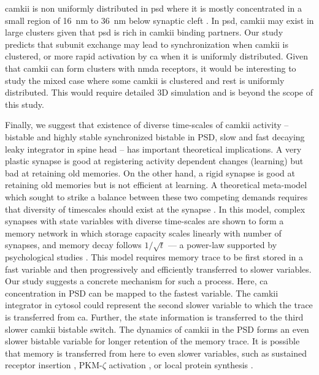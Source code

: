 \documentclass[9pt,lineno]{elife}
\begin{document}
\Gls{camkii} is non uniformly distributed in \gls{psd} where it is mostly
concentrated in a small region of \SI{16}{\nano \meter} to \SI{36}{\nano \meter}
below synaptic cleft \citep{petersen_distribution_2003}. In \gls{psd},
\gls{camkii} may exist in large clusters given that \gls{psd} is rich in
\gls{camkii} binding partners.  Our study predicts that subunit exchange may
lead to synchronization when \gls{camkii} is clustered, or more rapid activation
by \gls{ca} when it is uniformly distributed. Given that \gls{camkii} can form
clusters with \gls{nmda} receptors, it would be interesting to study the mixed
case where some \gls{camkii} is clustered and rest is uniformly distributed.
This would require detailed 3D simulation and is beyond the scope of this study.

Finally, we suggest that existence of diverse time-scales of \gls{camkii}
activity -- bistable and highly stable synchronized bistable in PSD, slow and
fast decaying leaky integrator in spine head -- has important theoretical
implications. A very plastic synapse is good at registering activity dependent
changes (learning) but bad at retaining old memories. On the other hand, a rigid
synapse is good at retaining old memories but is not efficient at learning. A
theoretical meta-model which sought to strike a balance between these two
competing demands requires that diversity of timescales should exist at the
synapse \citep{benna_computational_2016}. In this model, complex synapses with
state variables with diverse time-scales are shown to form a memory network in
which storage capacity scales linearly with number of synapses, and memory decay
follows \(1/\sqrt{t}\) --- a power-law supported by psychological studies
\citep{wixted_form_1991}. This model requires memory trace to be first stored in
a fast variable and then progressively and efficiently transferred to slower
variables.  Our study suggests a concrete mechanism for such a process. Here,
\gls{ca} concentration in PSD can be mapped to the fastest variable.  The
\gls{camkii} integrator in cytosol could represent the second slower variable to
which the trace is transferred from \gls{ca}. Further, the state information is
transferred to the third slower \gls{camkii} bistable switch. The dynamics of
\gls{camkii} in the PSD forms an even slower bistable variable for longer
retention of the memory trace. It is possible that memory is transferred from
here to even slower variables, such as sustained receptor insertion
\citep{hayer_molecular_2005}, PKM-$\zeta$ activation
\citep{sacktor_memory_2012}, or local protein synthesis
\citep{aslam_translational_2009}.
\end{document}
